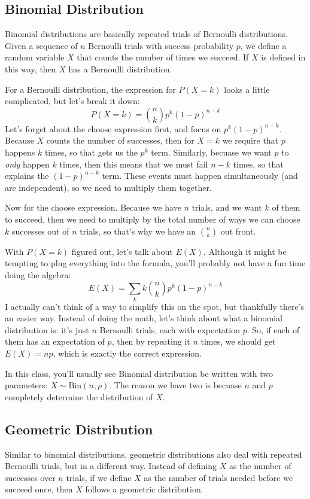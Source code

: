 \documentclass[10pt]{article}
\begin{document}
\subsection{Binomial Distribution}
Binomial distributions are basically repeated trials of Bernoulli distributions. Given a sequence of \( n \) 
Bernoulli trials with success probability \( p \), we define a random variable \( X \) that counts the number of 
times we succeed. If \( X \) is defined in this way, then \( X \) has a Bernoulli distribution.  

For a Bernoulli distribution, the expression for \( P(X = k) \) looks a little complicated, but let's break it down:
\[
	P(X = k) = {n \choose k} p^{k}(1-p)^{n - k}
\] 
Let's forget about the choose expression first, and focus on \( p^{k}(1-p)^{n - k} \). Because \( X \) 
counts the number of successes, then for \( X = k \) we require that \( p \) happens \( k \) times, so 
that gets us the \( p^{k}  \) term. Similarly, becuase we want \( p \) to \textit{only} happen \( k \) times, 
then this means that we must fail \( n-k \) times, so that explains the \( (1-p)^{n-k} \) term. These events 
must happen simultaneously (and are independent), so we need to multiply them together. 

Now for the choose expression. Because we have \( n \) trials, and we want \( k \) of them to succeed, then 
we need to multiply by the total number of ways we can choose \( k \) successes out of  \( n \) trials, so 
that's why we have an \( {n \choose k} \) out front. 
 
With \( P(X = k) \) figured out, let's talk about \( E(X) \). Although it might be tempting to plug 
everything into the formula, you'll probably not have a fun time doing the algebra:
\[
	E(X) = \sum_k k {n \choose k} p^{k}(1-p)^{n - k}
\] 
I actually can't think of a way to simplify this on the spot, but thankfully there's an easier way. 
Instead of doing the math, let's think 
about what a binomial distribution is: it's just \( n \) Bernoulli trials, each with expectation \( p \). So, 
if each of them has an expectation of \( p \), then by repeating it \( n \) times, we should get \( E(X) = np \), which 
is exactly the correct expression.

In this class, you'll usually see Binomial distribution be written with two parameters: \( X \sim \text{Bin}(n, p) \). The 
reason we have two is becuase \( n \) and \( p \) completely determine the distribution of \( X \). 
\subsection{Geometric Distribution}
Similar to binomial distributions, geometric distributions also deal with repeated Bernoulli trials, but in a different
way. Instead of defining \( X \) as the number of successes over \( n \) trials, 
if we define \( X \) as the number of trials needed
before we succeed once, then \( X \) follows a geometric distribution. 
\end{document}
